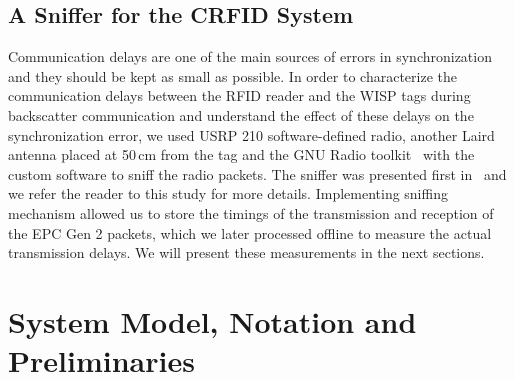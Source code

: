 \documentclass[10pt,journal,compsoc]{IEEEtran}
\begin{document}
\subsection{\label{sec:sniffer}A Sniffer for the CRFID System}


Communication delays are one of the main sources of errors in synchronization~\cite{Maroti2004} and they should be kept as small as possible. In order to characterize the communication delays between the RFID reader and the WISP tags during backscatter communication and understand the effect of these delays on the synchronization error, we used USRP 210 software-defined radio, another Laird antenna placed at 50\,cm from the tag and the GNU Radio toolkit~\cite{gnuradio} with the custom software to sniff the radio packets. The sniffer was presented first in~\cite{stork:2017} and we refer the reader to this study for more details. Implementing sniffing mechanism allowed us to store the timings of the transmission and reception of the EPC Gen 2 packets, which we later processed offline to measure the actual transmission delays. We will present these measurements in the next sections. 
\section{System Model, Notation and Preliminaries}
\label{sec:clock_model}
\end{document}
